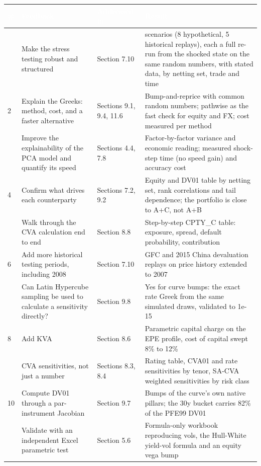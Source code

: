\documentclass[11pt,letterpaper]{article}
\begin{document}
{\scriptsize\setlength{\LTpre}{4pt}\setlength{\LTpost}{6pt}
\begin{longtable}{>{\raggedright\arraybackslash}p{}>{\raggedright\arraybackslash}p{}>{\raggedright\arraybackslash}p{}>{\raggedright\arraybackslash}p{}}
\toprule
\rowcolor{navy}\textbf{\textcolor{white}{\#}} & \textbf{\textcolor{white}{Feedback}} & \textbf{\textcolor{white}{Addressed in}} & \textbf{\textcolor{white}{Result}} \\
\endhead
1 & Make the stress testing robust and structured & Section 7.10 & 13 scenarios (8 hypothetical, 5 historical replays), each a full re-run from the shocked state on the same random numbers, with stated data, by netting set, trade and time \\
\rowcolor{gray!9}2 & Explain the Greeks: method, cost, and a faster alternative & Sections 9.1, 9.4, 11.6 & Bump-and-reprice with common random numbers; pathwise as the fast check for equity and FX; cost measured per method \\
3 & Improve the explainability of the PCA model and quantify its speed & Sections 4.4, 7.8 & Factor-by-factor variance and economic reading; measured shock-step time (no speed gain) and accuracy cost \\
\rowcolor{gray!9}4 & Confirm what drives each counterparty & Sections 7.2, 9.2 & Equity and DV01 table by netting set, rank correlations and tail dependence; the portfolio is close to A+C, not A+B \\
5 & Walk through the CVA calculation end to end & Section 8.8 & Step-by-step CPTY\_C table: exposure, spread, default probability, contribution \\
\rowcolor{gray!9}6 & Add more historical testing periods, including 2008 & Section 7.10 & 2008 GFC and 2015 China devaluation replays on price history extended to 2007 \\
7 & Can Latin Hypercube sampling be used to calculate a sensitivity directly? & Section 9.8 & Yes for curve bumps: the exact rate Greek from the same simulated draws, validated to 1e-15 \\
\rowcolor{gray!9}8 & Add KVA & Section 8.6 & Parametric capital charge on the EPE profile, cost of capital swept 8\% to 12\% \\
9 & CVA sensitivities, not just a number & Sections 8.3, 8.4 & Rating table, CVA01 and rate sensitivities by tenor, SA-CVA weighted sensitivities by risk class \\
\rowcolor{gray!9}10 & Compute DV01 through a par-instrument Jacobian & Section 9.7 & Bumps of the curve's own native pillars; the 30y bucket carries 82\% of the PFE99 DV01 \\
11 & Validate with an independent Excel parametric test & Section 5.6 & Formula-only workbook reproducing vols, the Hull-White yield-vol formula and an equity vega bump \\
\bottomrule
\end{longtable}}
\end{document}
